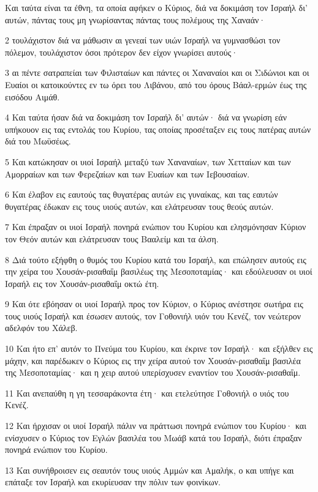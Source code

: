 \par Και ταύτα είναι τα έθνη, τα οποία αφήκεν ο Κύριος, διά να δοκιμάση τον Ισραήλ δι' αυτών, πάντας τους μη γνωρίσαντας πάντας τους πολέμους της Χαναάν·
\par 2 τουλάχιστον διά να μάθωσιν αι γενεαί των υιών Ισραήλ να γυμνασθώσι τον πόλεμον, τουλάχιστον όσοι πρότερον δεν είχον γνωρίσει αυτούς·
\par 3 αι πέντε σατραπείαι των Φιλισταίων και πάντες οι Χαναναίοι και οι Σιδώνιοι και οι Ευαίοι οι κατοικούντες εν τω όρει του Λιβάνου, από του όρους Βάαλ-ερμών έως της εισόδου Αιμάθ.
\par 4 Και ταύτα ήσαν διά να δοκιμάση τον Ισραήλ δι' αυτών· διά να γνωρίση εάν υπήκουον εις τας εντολάς του Κυρίου, τας οποίας προσέταξεν εις τους πατέρας αυτών διά του Μωϋσέως.
\par 5 Και κατώκησαν οι υιοί Ισραήλ μεταξύ των Χαναναίων, των Χετταίων και των Αμορραίων και των Φερεζαίων και των Ευαίων και των Ιεβουσαίων.
\par 6 Και έλαβον εις εαυτούς τας θυγατέρας αυτών εις γυναίκας, και τας εαυτών θυγατέρας έδωκαν εις τους υιούς αυτών, και ελάτρευσαν τους θεούς αυτών.
\par 7 Και έπραξαν οι υιοί Ισραήλ πονηρά ενώπιον του Κυρίου και ελησμόνησαν Κύριον τον Θεόν αυτών και ελάτρευσαν τους Βααλείμ και τα άλση.
\par 8 Διά τούτο εξήφθη ο θυμός του Κυρίου κατά του Ισραήλ, και επώλησεν αυτούς εις την χείρα του Χουσάν-ρισαθαΐμ βασιλέως της Μεσοποταμίας· και εδούλευσαν οι υιοί Ισραήλ εις τον Χουσάν-ρισαθαΐμ οκτώ έτη.
\par 9 Και ότε εβόησαν οι υιοί Ισραήλ προς τον Κύριον, ο Κύριος ανέστησε σωτήρα εις τους υιούς Ισραήλ και έσωσεν αυτούς, τον Γοθονιήλ υιόν του Κενέζ, τον νεώτερον αδελφόν του Χάλεβ.
\par 10 Και ήτο επ' αυτόν το Πνεύμα του Κυρίου, και έκρινε τον Ισραήλ· και εξήλθεν εις μάχην, και παρέδωκεν ο Κύριος εις την χείρα αυτού τον Χουσάν-ρισαθαΐμ βασιλέα της Μεσοποταμίας· και η χειρ αυτού υπερίσχυσεν εναντίον του Χουσάν-ρισαθαΐμ.
\par 11 Και ανεπαύθη η γη τεσσαράκοντα έτη· και ετελεύτησε Γοθονιήλ ο υιός του Κενέζ.
\par 12 Και ήρχισαν οι υιοί Ισραήλ πάλιν να πράττωσι πονηρά ενώπιον του Κυρίου· και ενίσχυσεν ο Κύριος τον Εγλών βασιλέα του Μωάβ κατά του Ισραήλ, διότι έπραξαν πονηρά ενώπιον του Κυρίου.
\par 13 Και συνήθροισεν εις σεαυτόν τους υιούς Αμμών και Αμαλήκ, ο και υπήγε και επάταξε τον Ισραήλ και εκυρίευσαν την πόλιν των φοινίκων.
